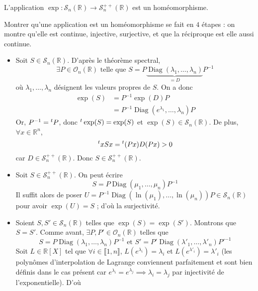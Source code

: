 	\begin{theorem}
		L'application $\exp : \mathcal{S}_n(\mathbb{R}) \rightarrow \mathcal{S}^{++}_n(\mathbb{R})$ est un homéomorphisme.
	\end{theorem}

	\begin{demonstration}
		Montrer qu'une application est un homéomorphisme se fait en $4$ étapes : on montre qu'elle est continue, injective, surjective, et que la réciproque est elle aussi continue.
		\begin{itemize}
			\item {} Soit $S \in \mathcal{S}_n(\mathbb{R})$. D'après le théorème spectral,
			\[ \exists P \in \mathcal{O}_n(\mathbb{R}) \text{ telle que } S = P \underbrace{\operatorname{Diag}(\lambda_1, \dots, \lambda_n)}_{= D}P^{-1} \]
			où $\lambda_1, \dots, \lambda_n$ désignent les valeurs propres de $S$. On a donc
			\begin{align*}
				\exp(S) &= P^{-1} \exp(D) P \\
				&= P^{-1} \operatorname{Diag}(e^{\lambda_1}, \dots, \lambda_n) P
			\end{align*}
			Or, $P^{-1} = \mathstrut ^t P$, donc $\mathstrut ^t \exp(S) = \exp(S)$ et $\exp(S) \in \mathcal{S}_n(\mathbb{R})$. De plus, $\forall x \in \mathbb{R}^n$,
			\[ \mathstrut ^t x S x = \mathstrut ^t (Px) D (Px) > 0 \]
			car $D \in \mathcal{S}^{++}_n(\mathbb{R})$. Donc $S \in \mathcal{S}^{++}_n(\mathbb{R})$.
			\item {} Soit $S \in \mathcal{S}^{++}_n(\mathbb{R})$. On peut écrire
			\[ S = P \operatorname{Diag}(\mu_1, \dots, \mu_n) P^{-1} \]
			Il suffit alors de poser $U = P^{-1} \operatorname{Diag}(\ln(\mu_1), \dots, \ln(\mu_n)) P \in \mathcal{S}_n(\mathbb{R})$ pour avoir $\exp(U) = S$ ; d'où la surjectivité.
			\item {} Soient $S, S' \in \mathcal{S}_n(\mathbb{R})$ telles que $\exp(S) = \exp(S')$. Montrons que $S = S'$. Comme avant, $\exists P, P' \in \mathcal{O}_n(\mathbb{R})$ telles que
			\[ S = P \operatorname{Diag}(\lambda_1, \dots, \lambda_n) P^{-1} \text{ et } S' = P' \operatorname{Diag}(\lambda'_1, \dots, \lambda'_n) P'^{-1} \]
			Soit $L \in \mathbb{R}[X]$ tel que $\forall i \in \llbracket 1, n \rrbracket$, $L(e^{\lambda_i}) = \lambda_i$ et $L(e^{\lambda'_i}) = \lambda'_i$ (les polynômes d'interpolation de Lagrange conviennent parfaitement et sont bien définis dans le cas présent car $e^{\lambda_i} = e^{\lambda_j} \implies \lambda_i = \lambda_j$ par injectivité de l'exponentielle). D'où

\end{itemize}
\end{demonstration}
